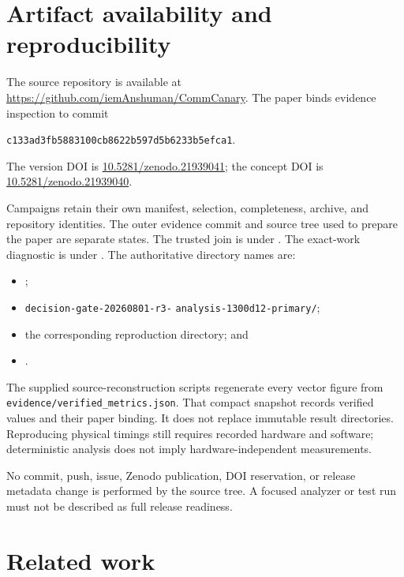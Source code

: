\documentclass[10pt,twocolumn]{article}
\begin{document}
\section{Artifact availability and reproducibility}

The source repository is available at
\url{https://github.com/iemAnshuman/CommCanary}. The paper binds evidence
inspection to commit
\begin{center}
\texttt{c133ad3fb5883100cb8622b597d5b6233b5efca1}.
\end{center}
The version DOI is \href{https://doi.org/10.5281/zenodo.21939041}
{10.5281/zenodo.21939041}; the concept DOI is
\href{https://doi.org/10.5281/zenodo.21939040}{10.5281/zenodo.21939040}.

Campaigns retain their own manifest, selection, completeness, archive, and
repository identities. The outer evidence commit and source tree used to
prepare the paper are separate states. The trusted join is under
. The exact-work diagnostic is
under .
The authoritative directory names are:

\begin{itemize}
  \item {};
  \item \texttt{decision-gate-20260801-r3-}\allowbreak
    \texttt{analysis-1300d12-primary/};
  \item the corresponding reproduction directory; and
  \item {}.
\end{itemize}

The supplied source-reconstruction scripts regenerate every vector figure from
\texttt{evidence/verified\_metrics.json}. That compact snapshot records verified
values and their paper binding. It does not replace immutable result
directories. Reproducing physical timings still requires recorded hardware and
software; deterministic analysis does not imply hardware-independent
measurements.

No commit, push, issue, Zenodo publication, DOI reservation, or release
metadata change is performed by the source tree. A focused analyzer or test run
must not be described as full release readiness.

\section{Related work}
\end{document}
